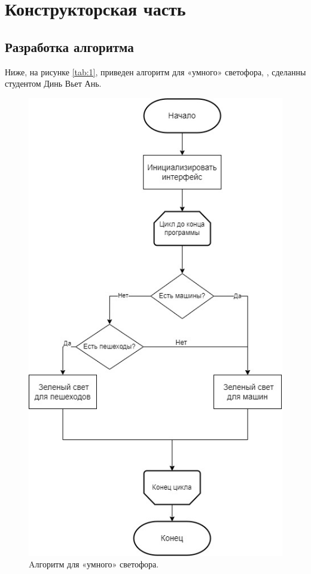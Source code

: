 \section{Конструкторская часть}

\subsection{Разработка алгоритма}
Ниже, на рисунке \ref{tab:1}, приведен алгоритм для «умного» светофора, , сделанны студентом Динь Вьет Ань.

\begin{figure}[H]
	\begin{center}
		\includegraphics[scale=0.7]{img/al.jpg}
	\end{center}
	\captionsetup{justification=centering}
	\caption{Aлгоритм для «умного» светофора.}
	\label{img:s14}
\end{figure}
